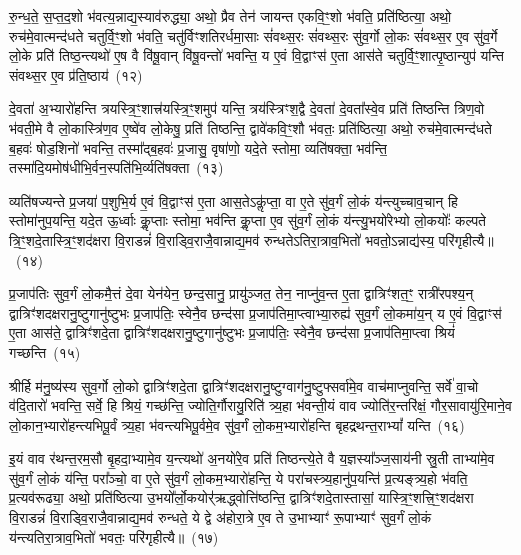 रु॒न्ध॒ते॒ स॒प्त॒द॒शो भ॑वत्य॒न्नाद्य॒स्याव॑रुद्ध्या॒ अथो॒ प्रैव तेन॑ जायन्त एकवि॒ꣳ॒शो भ॑वति॒ प्रति॑ष्ठित्या॒ अथो॒ रुच॑मे॒वात्मन्द॑धते चतुर्वि॒ꣳ॒शो भ॑वति॒ चतु॑र्विꣳशतिरर्धमा॒साः सं॑वथ्स॒रः सं॑वथ्स॒रः सु॑व॒र्गो लो॒कः सं॑वथ्स॒र ए॒व सु॑व॒र्गे लो॒के प्रति॑ तिष्ठ॒न्त्यथो॑ ए॒ष वै वि॑षू॒वान् वि॑षू॒वन्तो॑ भवन्ति॒ य ए॒वं वि॒द्वाꣳस॑ ए॒ता आस॑ते चतुर्वि॒ꣳ॒शात्पृ॒ष्ठान्युप॑ यन्ति संवथ्स॒र ए॒व प्र॑ति॒ष्ठाय॑~(१२)

दे॒वता॑ अ॒भ्यारो॑हन्ति त्रयस्त्रि॒ꣳ॒शात्त्र॑यस्त्रि॒ꣳ॒शमुप॑ यन्ति॒ त्रय॑स्त्रिꣳश॒द्वै दे॒वता॑ दे॒वता᳚स्वे॒व प्रति॑ तिष्ठन्ति त्रिण॒वो भ॑वती॒मे वै लो॒कास्त्रि॑ण॒व ए॒ष्वे॑व लो॒केषु॒ प्रति॑ तिष्ठन्ति॒ द्वावे॑कवि॒ꣳ॒शौ भ॑वतः॒ प्रति॑ष्ठित्या॒ अथो॒ रुच॑मे॒वात्मन्द॑धते ब॒हवः॑ षोड॒शिनो॑ भवन्ति॒ तस्मा᳚द्ब॒हवः॑ प्र॒जासु॒ वृषा॑णो॒ यदे॒ते स्तोमा॒ व्यति॑षक्ता॒ भव॑न्ति॒ तस्मा॑दि॒यमोष॑धीभि॒र्वन॒स्पति॑भि॒र्व्यति॑षक्ता~(१३)

व्यति॑षज्यन्ते प्र॒जया॑ प॒शुभि॒र्य ए॒वं वि॒द्वाꣳस॑ ए॒ता आस॒ते\-ऽकॢ॑प्ता॒ वा ए॒ते सु॑व॒र्गं लो॒कं य॑न्त्युच्चाव॒चान् हि स्तोमा॑नुप॒यन्ति॒ यदे॒त ऊ॒र्ध्वाः कॢ॒प्ताः स्तोमा॒ भव॑न्ति कॢ॒प्ता ए॒व सु॑व॒र्गं लो॒कं य॑न्त्यु॒भयो॑रेभ्यो लो॒कयोः᳚ कल्पते त्रि॒ꣳ॒शदे॒तास्त्रि॒ꣳ॒शद॑क्षरा वि॒राडन्नं॑ वि॒राड्वि॒राजै॒वान्नाद्य॒मव॑ रुन्धते\-ऽतिरा॒त्राव॒भितो॑ भवतो॒\-ऽन्नाद्य॑स्य॒ परि॑गृहीत्यै॥~(१४)

{\anuvakamend[{ओष॑धीः संवथ्स॒र ए॒वाव॑ प्रति॒ष्ठाय॒ व्यति॑ष॒क्तैका॒न्नप॑ञ्चा॒शच्च॑}]}%

प्र॒जा\-प॑तिः सुव॒र्गं लो॒कमै॒त्तं दे॒वा येन॑येन॒ छन्द॒सानु॒ प्रायु॑ञ्जत॒ तेन॒ नाप्नु॑व॒न्त ए॒ता द्वात्रिꣳ॑शत॒ꣳ॒ रात्री॑रपश्य॒न् द्वात्रिꣳ॑शदक्षरानु॒ष्टुगानु॑ष्टुभः प्र॒जा\-प॑तिः॒ स्वेनै॒व छन्द॑सा प्र॒जा\-प॑तिमा॒प्त्वाभ्या॒रुह्य॑ सुव॒र्गं लो॒कमा॑य॒न् य ए॒वं वि॒द्वाꣳस॑ ए॒ता आस॑ते॒ द्वात्रिꣳ॑शदे॒ता द्वात्रिꣳ॑शदक्षरानु॒ष्टुगानु॑ष्टुभः प्र॒जा\-प॑तिः॒ स्वेनै॒व छन्द॑सा प्र॒जा\-प॑तिमा॒प्त्वा श्रियं॑ गच्छन्ति~(१५)

श्रीर्\mbox{}हि म॑नु॒ष्य॑स्य सुव॒र्गो लो॒को द्वात्रिꣳ॑शदे॒ता द्वात्रिꣳ॑शदक्षरानु॒ष्टुग्वाग॑नु॒ष्टुफ्सर्वा॑मे॒व वाच॑माप्नुवन्ति॒ सर्वे॑ वा॒चो व॑दि॒तारो॑ भवन्ति॒ सर्वे॒ हि श्रियं॒ गच्छ॑न्ति॒ ज्योति॒र्गौरायु॒रिति॑ त्र्य॒हा भ॑वन्ती॒यं वाव ज्योति॑र॒न्तरि॑क्षं॒ गौर॒सावायु॑\-रि॒माने॒व लो॒कान॒भ्यारो॑हन्त्यभिपू॒र्वं त्र्य॒हा भ॑वन्त्यभिपू॒र्वमे॒व सु॑व॒र्गं लो॒कम॒भ्यारो॑हन्ति बृहद्रथन्त॒रा\-भ्यां᳚ यन्ति~(१६)

इ॒यं वाव र॑थन्त॒रम॒सौ बृ॒हदा॒भ्यामे॒व य॒न्त्यथो॑ अ॒नयो॑रे॒व प्रति॑ तिष्ठन्त्ये॒ते वै य॒ज्ञस्या᳚ञ्ज॒साय॑नी स्रु॒ती ताभ्या॑मे॒व सु॑व॒र्गं लो॒कं य॑न्ति॒ परा᳚ञ्चो॒ वा ए॒ते सु॑व॒र्गं लो॒कम॒भ्यारो॑हन्ति॒ ये परा॑चस्त्र्य॒हानु॑प॒यन्ति॑ प्र॒त्यङ्त्र्य॒हो भ॑वति॒ प्र॒त्यव॑रूढ्या॒ अथो॒ प्रति॑ष्ठित्या उ॒भयो᳚र्लो॒कयोर्॑\mbox{}॑ऋद्ध्वोत्ति॑ष्ठन्ति॒ द्वात्रिꣳ॑शदे॒तास्तासां॒ यास्त्रि॒ꣳ॒शत्त्रि॒ꣳ॒शद॑क्षरा वि॒राडन्नं॑ वि॒राड्वि॒राजै॒वान्नाद्य॒मव॑ रुन्धते॒ ये द्वे अ॑होरा॒त्रे ए॒व ते उ॒भाभ्याꣳ॑ रू॒पाभ्याꣳ॑ सुव॒र्गं लो॒कं य॑न्त्यतिरा॒त्राव॒भितो॑ भवतः॒ परि॑गृहीत्यै॥~(१७)


